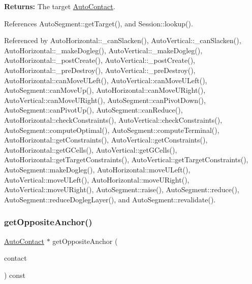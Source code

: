 {\bfseries Returns\+:} The target \mbox{\hyperlink{classKatabatic_1_1AutoContact}{Auto\+Contact}}. 

References Auto\+Segment\+::get\+Target(), and Session\+::lookup().



Referenced by Auto\+Horizontal\+::\+\_\+can\+Slacken(), Auto\+Vertical\+::\+\_\+can\+Slacken(), Auto\+Horizontal\+::\+\_\+make\+Dogleg(), Auto\+Vertical\+::\+\_\+make\+Dogleg(), Auto\+Horizontal\+::\+\_\+post\+Create(), Auto\+Vertical\+::\+\_\+post\+Create(), Auto\+Horizontal\+::\+\_\+pre\+Destroy(), Auto\+Vertical\+::\+\_\+pre\+Destroy(), Auto\+Horizontal\+::can\+Move\+U\+Left(), Auto\+Vertical\+::can\+Move\+U\+Left(), Auto\+Segment\+::can\+Move\+Up(), Auto\+Horizontal\+::can\+Move\+U\+Right(), Auto\+Vertical\+::can\+Move\+U\+Right(), Auto\+Segment\+::can\+Pivot\+Down(), Auto\+Segment\+::can\+Pivot\+Up(), Auto\+Segment\+::can\+Reduce(), Auto\+Horizontal\+::check\+Constraints(), Auto\+Vertical\+::check\+Constraints(), Auto\+Segment\+::compute\+Optimal(), Auto\+Segment\+::compute\+Terminal(), Auto\+Horizontal\+::get\+Constraints(), Auto\+Vertical\+::get\+Constraints(), Auto\+Horizontal\+::get\+G\+Cells(), Auto\+Vertical\+::get\+G\+Cells(), Auto\+Horizontal\+::get\+Target\+Constraints(), Auto\+Vertical\+::get\+Target\+Constraints(), Auto\+Segment\+::make\+Dogleg(), Auto\+Horizontal\+::move\+U\+Left(), Auto\+Vertical\+::move\+U\+Left(), Auto\+Horizontal\+::move\+U\+Right(), Auto\+Vertical\+::move\+U\+Right(), Auto\+Segment\+::raise(), Auto\+Segment\+::reduce(), Auto\+Segment\+::reduce\+Dogleg\+Layer(), and Auto\+Segment\+::revalidate().

\mbox{\label{classKatabatic_1_1AutoSegment_a2c5b0faacc768bf61e17eb72a4ccc248}} 
\subsubsection{\texorpdfstring{get\+Opposite\+Anchor()}{getOppositeAnchor()}\hspace{0.1cm}{\footnotesize\ttfamily [2/2]}}
{\footnotesize\ttfamily \mbox{\hyperlink{classKatabatic_1_1AutoContact}{Auto\+Contact}} $\ast$ get\+Opposite\+Anchor (\begin{DoxyParamCaption}\item[{\mbox{\hyperlink{classKatabatic_1_1AutoContact}{Auto\+Contact}} $\ast$}]{contact }\end{DoxyParamCaption}) const}


